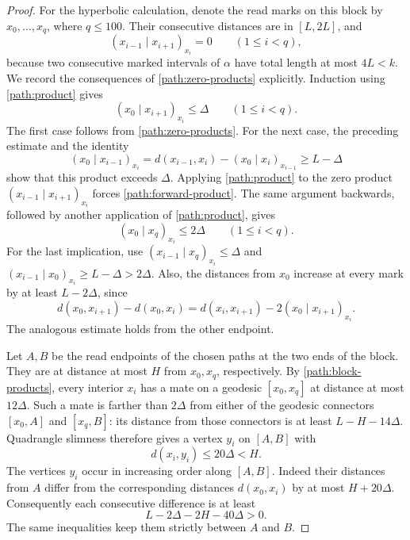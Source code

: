 \documentclass[11pt,reqno]{amsart}
\numberwithin{equation}{section}
\theoremstyle{definition}
\theoremstyle{remark}
\begin{document}
\begin{proof}
For the hyperbolic calculation, denote the read marks on this block by
$x_0,\ldots,x_q$, where $q\le100$.  Their consecutive distances are in
$[L,2L]$, and
\begin{equation}\label{path:zero-products}
 (x_{i-1}\mid x_{i+1})_{x_i}=0\qquad(1\le i<q),
\end{equation}
because two consecutive marked intervals of $\alpha$ have total length
at most $4L<k$.  We record the consequences of
\eqref{path:zero-products} explicitly.  Induction using
\eqref{path:product} gives
\begin{equation}\label{path:forward-product}
 (x_0\mid x_{i+1})_{x_i}\le\Delta\qquad(1\le i<q).
\end{equation}
The first case follows from \eqref{path:zero-products}.  For the next
case, the preceding estimate and the identity
\[
 (x_0\mid x_{i-1})_{x_i}
 =d(x_{i-1},x_i)-(x_0\mid x_i)_{x_{i-1}}
 \ge L-\Delta
\]
show that this product exceeds $\Delta$.  Applying
\eqref{path:product} to the zero product
$(x_{i-1}\mid x_{i+1})_{x_i}$ forces
\eqref{path:forward-product}.  The same argument backwards, followed
by another application of \eqref{path:product}, gives
\begin{equation}\label{path:block-products}
 (x_0\mid x_q)_{x_i}\le2\Delta\qquad(1\le i<q).
\end{equation}
For the last implication, use
$(x_{i-1}\mid x_q)_{x_i}\le\Delta$ and
$(x_{i-1}\mid x_0)_{x_i}\ge L-\Delta>2\Delta$.
Also, the distances from $x_0$ increase at every mark by at least
$L-2\Delta$, since
\[
 d(x_0,x_{i+1})-d(x_0,x_i)
 =d(x_i,x_{i+1})-2(x_0\mid x_{i+1})_{x_i}.
\]
The analogous estimate holds from the other endpoint.

Let $A,B$ be the read endpoints of the chosen paths at the two ends of
the block.  They are at distance at most $H$ from $x_0,x_q$,
respectively.  By \eqref{path:block-products}, every interior $x_i$
has a mate on a geodesic $[x_0,x_q]$ at distance at most $12\Delta$.
Such a mate is farther than $2\Delta$ from either of the geodesic
connectors $[x_0,A]$ and $[x_q,B]$: its distance from those connectors
is at least $L-H-14\Delta$.  Quadrangle slimness therefore gives a
vertex $y_i$ on $[A,B]$ with
\begin{equation}\label{path:block-mates}
 d(x_i,y_i)\le20\Delta<H.
\end{equation}
The vertices $y_i$ occur in increasing order along $[A,B]$.  Indeed
their distances from $A$ differ from the corresponding distances
$d(x_0,x_i)$ by at most $H+20\Delta$.  Consequently each consecutive
difference is at least
\[
 L-2\Delta-2H-40\Delta>0.
\]
The same inequalities keep them strictly between $A$ and $B$.


\end{proof}
\end{document}
